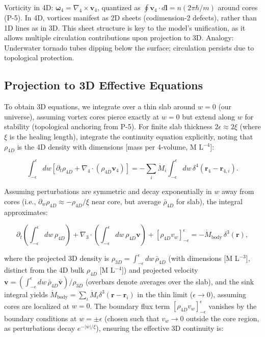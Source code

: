 \documentclass{article}
\begin{document}
Vorticity in 4D: $\boldsymbol{\omega}_4 = \nabla_4 \times \mathbf{v}_4$, quantized as $\oint \mathbf{v}_4 \cdot d\mathbf{l} = n (2\pi \hbar / m)$ around cores (P-5). In 4D, vortices manifest as 2D sheets (codimension-2 defects), rather than 1D lines as in 3D. This sheet structure is key to the model's unification, as it allows multiple circulation contributions upon projection to 3D. Analogy: Underwater tornado tubes dipping below the surface; circulation persists due to topological protection.

\subsection{Projection to 3D Effective Equations}

To obtain 3D equations, we integrate over a thin slab around $w=0$ (our universe), assuming vortex cores pierce exactly at $w=0$ but extend along $w$ for stability (topological anchoring from P-5). For finite slab thickness $2\epsilon \approx 2\xi$ (where $\xi$ is the healing length), integrate the continuity equation explicitly, noting that $\rho_{4D}$ is the 4D density with dimensions [mass per 4-volume, M L$^{-4}$]:

\[
\int_{-\epsilon}^{\epsilon} dw \left[ \partial_t \rho_{4D} + \nabla_4 \cdot (\rho_{4D} \mathbf{v}_4) \right] = -\sum_i \dot{M}_i \int_{-\epsilon}^{\epsilon} dw \, \delta^4(\mathbf{r}_4 - \mathbf{r}_{4,i}).
\]

Assuming perturbations are symmetric and decay exponentially in $w$ away from cores (i.e., $\partial_w \rho_{4D} \approx - \rho_{4D} / \xi$ near core, but average $\bar{\rho}_{4D}$ for slab), the integral approximates:

\[
\partial_t \left( \int_{-\epsilon}^{\epsilon} dw \, \rho_{4D} \right) + \nabla_3 \cdot \left( \int_{-\epsilon}^{\epsilon} dw \, \rho_{4D} \mathbf{v} \right) + [\rho_{4D} v_w]_{-\epsilon}^{\epsilon} = -\dot{M}_{\text{body}} \, \delta^3(\mathbf{r}),
\]

where the projected 3D density is $\rho_{3D} = \int_{-\epsilon}^{\epsilon} dw \, \bar{\rho}_{4D}$ (with dimensions [M L$^{-3}$], distinct from the 4D bulk $\rho_{4D}$ [M L$^{-4}$]) and projected velocity $\mathbf{v} = \left( \int_{-\epsilon}^{\epsilon} dw \, \bar{\rho}_{4D} \bar{\mathbf{v}} \right) / \rho_{3D}$ (overbars denote averages over the slab), and the sink integral yields $\dot{M}_{\text{body}} = \sum_i \dot{M}_i \delta^3(\mathbf{r} - \mathbf{r}_i)$ in the thin limit ($\epsilon \to 0$), assuming cores are localized at $w=0$. The boundary flux term $[\rho_{4D} v_w]_{-\epsilon}^{\epsilon}$ vanishes by the boundary conditions at $w = \pm \epsilon$ (chosen such that $v_w \to 0$ outside the core region, as perturbations decay $e^{-|w|/ \xi}$), ensuring the effective 3D continuity is:
\end{document}
